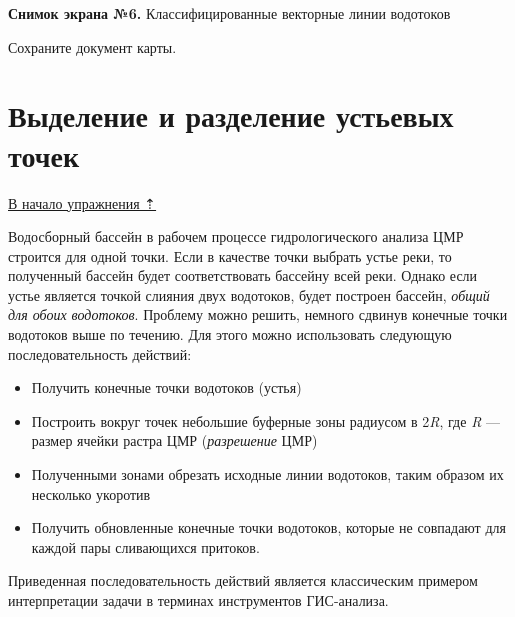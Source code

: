 \documentclass[]{book}
\theoremstyle{definition}
\theoremstyle{definition}
\theoremstyle{definition}
\theoremstyle{remark}
\begin{document}
\textbf{Снимок экрана №6.} Классифицированные векторные линии водотоков

Сохраните документ карты.

\hypertarget{dem-mouth}{%
\section{Выделение и разделение устьевых точек}\label{dem-mouth}}

\protect\hyperlink{dem-analysis}{В начало упражнения ⇡}

Водосборный бассейн в рабочем процессе гидрологического анализа ЦМР
строится для одной точки. Если в качестве точки выбрать устье реки, то
полученный бассейн будет соответствовать бассейну всей реки. Однако если
устье является точкой слияния двух водотоков, будет построен бассейн,
\emph{общий для обоих водотоков}. Проблему можно решить, немного сдвинув
конечные точки водотоков выше по течению. Для этого можно использовать
следующую последовательность действий:

\begin{itemize}
\item
  Получить конечные точки водотоков (устья)
\item
  Построить вокруг точек небольшие буферные зоны радиусом в 2\emph{R},
  где \emph{R} --- размер ячейки растра ЦМР (\emph{разрешение} ЦМР)
\item
  Полученными зонами обрезать исходные линии водотоков, таким образом их
  несколько укоротив
\item
  Получить обновленные конечные точки водотоков, которые не совпадают
  для каждой пары сливающихся притоков.
\end{itemize}

Приведенная последовательность действий является классическим примером
интерпретации задачи в терминах инструментов ГИС-анализа.
\end{document}
